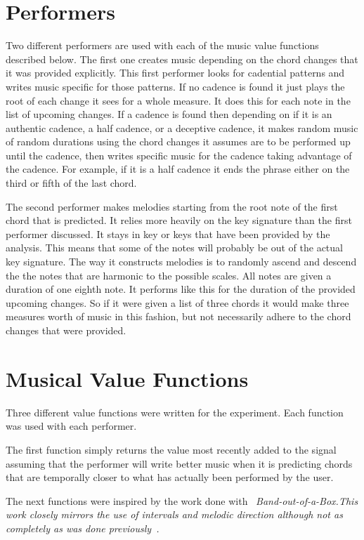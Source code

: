 \documentclass[12pt]{ucthesis}
\begin{document}
{\section{Performers}
\label {performers}

Two different performers are used with each of the music value functions described below. The first one creates music depending on the chord changes that it was provided explicitly. This first performer looks for cadential patterns and writes music specific for those patterns. If no cadence is found it just plays the root of each change it sees for a whole measure. It does this for each note in the list of upcoming changes. If a cadence is found then depending on if it is an authentic cadence, a half cadence, or a deceptive cadence, it makes random music of random durations using the chord changes it assumes are to be performed up until the cadence, then writes specific music for the cadence taking advantage of the cadence. For example, if it is a half cadence it ends the phrase either on the third or fifth of the last chord.

The second performer makes melodies starting from the root note of the first chord that is predicted. It relies more heavily on the key signature than the first performer discussed. It stays in key or keys that have been provided by the analysis. This means that some of the notes will probably be out of the actual key signature. The way it constructs melodies is to randomly ascend and descend the the notes that are harmonic to the possible scales. All notes are given a duration of one eighth note. It performs like this for the duration of the provided upcoming changes. So if it were given a list of three chords it would make three measures worth of music in this fashion, but not necessarily adhere to the chord changes that were provided.

\section{Musical Value Functions}
\label {musical-value-functions}
Three different value functions were written for the experiment. Each function was used with each performer. 

The first function simply returns the value most recently added to the signal assuming that the performer will write better music when it is predicting chords that are temporally closer to what has actually been performed by the user.  

The next functions were inspired by the work done with ~\em{Band-out-of-a-Box.}\em This work closely mirrors the use of intervals and melodic direction although not as completely as was done previously~\cite{bob}.

}
\end{document}

